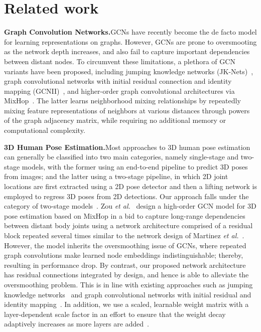 \documentclass{bmvc2k}
\begin{document}
\section{Related work}
\noindent\textbf{Graph Convolution Networks.}\quad GCNs have recently become the de facto model for learning representations on graphs. However, GCNs are prone to oversmooting as the network depth increases, and also fail to capture important dependencies between distant nodes. To circumvent these limitations, a plethora of GCN variants have been proposed, including jumping knowledge networks (JK-Nets)~\cite{Keyulu:18}, graph convolutional networks with initial residual connection and identity mapping (GCNII)~\cite{chen2020simple}, and higher-order graph convolutional architectures via MixHop~\cite{abu2019mixhop}. The latter learns neighborhood mixing relationships by repeatedly mixing feature representations of neighbors at various distances through powers of the graph adjacency matrix, while requiring no additional memory or computational complexity.

\medskip\noindent\textbf{3D Human Pose Estimation.}\quad Most approaches to 3D human pose estimation can generally be classified into two main categories, namely single-stage and two-stage models, with the former using an end-to-end pipeline to predict 3D poses from images; and the latter using a two-stage pipeline, in which 2D joint locations are first extracted using a 2D pose detector and then a lifting network is employed to regress 3D poses from 2D detections. Our approach falls under the category of two-stage models~\cite{zhou2017towards,martinez2017simple,yang20183d,fang2018learning,rayat2018exploiting,pavlakos2018ordinal,sharma2019monocular,ge20193d,pavllo20193d,zhao2019semantic,YujunCai:19,HaiCi:2019,Kenkun:2020,zou2020high}. Zou \textit{et al.}~\cite{zou2020high} design a high-order GCN model for 3D pose estimation based on MixHop in a bid to capture long-range dependencies between distant body joints using a network architecture comprised of a residual block repeated several times similar to the network design of Martinez \textit{et al.}~\cite{martinez2017simple}. However, the model inherits the oversmoothing issue of GCNs, where repeated graph convolutions make learned node embeddings indistinguishable; thereby, resulting in performance drop. By contrast, our proposed network architecture has residual connections integrated by design, and hence is able to alleviate the oversmoothing problem. This is in line with existing approaches such as jumping knowledge networks~\cite{Keyulu:18} and graph convolutional networks with initial residual and identity mapping~\cite{chen2020simple}. In addition, we use a scaled, learnable weight matrix with a layer-dependent scale factor in an effort to ensure that the weight decay adaptively increases as more layers are added~\cite{chen2020simple}.
\end{document}
